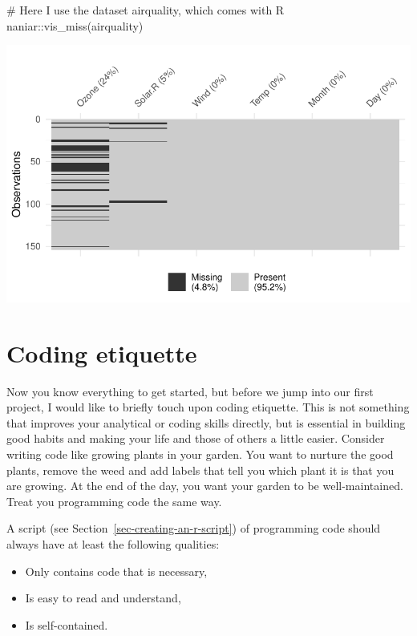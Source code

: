 \documentclass[
  letterpaper,
  DIV=11,
  numbers=noendperiod]{scrreprt}
\newenvironment{Shaded}{\begin{snugshade}}{\end{snugshade}}
\newcommand{\CommentTok}[1]{\textcolor[rgb]{0.37,0.37,0.37}{#1}}
\newcommand{\FunctionTok}[1]{\textcolor[rgb]{0.28,0.35,0.67}{#1}}
\newcommand{\NormalTok}[1]{\textcolor[rgb]{0.00,0.23,0.31}{#1}}
\newcommand{\SpecialCharTok}[1]{\textcolor[rgb]{0.37,0.37,0.37}{#1}}
\begin{document}
\begin{Shaded}
\begin{Highlighting}[]
\CommentTok{\# Here I use the dataset \textquotesingle{}airquality\textquotesingle{}, which comes with R}
\NormalTok{naniar}\SpecialCharTok{::}\FunctionTok{vis\_miss}\NormalTok{(airquality)}
\end{Highlighting}
\end{Shaded}

\includegraphics{05_r_basics_files/figure-latex/explicitly-calling-functions-1.pdf}

\section{Coding etiquette}\label{sec-coding-etiquette}

Now you know everything to get started, but before we jump into our
first project, I would like to briefly touch upon coding etiquette. This
is not something that improves your analytical or coding skills
directly, but is essential in building good habits and making your life
and those of others a little easier. Consider writing code like growing
plants in your garden. You want to nurture the good plants, remove the
weed and add labels that tell you which plant it is that you are
growing. At the end of the day, you want your garden to be
well-maintained. Treat you programming code the same way.

A script (see Section~\ref{sec-creating-an-r-script}) of programming
code should always have at least the following qualities:

\begin{itemize}
\item
  Only contains code that is necessary,
\item
  Is easy to read and understand,
\item
  Is self-contained.
\end{itemize}
\end{document}
